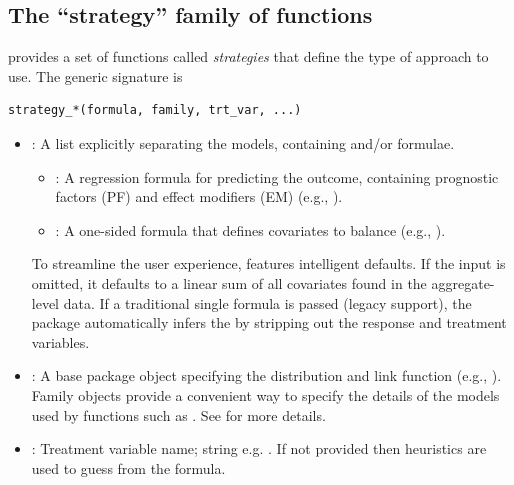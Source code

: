 \documentclass[article]{jss}
\begin{document}
\subsection{The ``strategy'' family of functions}
 provides a set of functions called \emph{strategies} that define the type of approach to use. The generic signature is

\begin{verbatim}
strategy_*(formula, family, trt_var, ...)
\end{verbatim}

\begin{itemize}
\item {}: A list explicitly separating the models, containing  and/or  formulae. 
    \begin{itemize}
        \item {}: A regression formula for predicting the outcome, containing prognostic factors (PF) and effect modifiers (EM) (e.g., ).
        \item {}: A one-sided formula that defines covariates to balance (e.g., ).
    \end{itemize}
    To streamline the user experience,  features intelligent defaults. If the input  is omitted, it defaults to a linear sum of all covariates found in the aggregate-level data. If a traditional single formula is passed (legacy support), the package automatically infers the  by stripping out the response and treatment variables.
    \item {}: A base   package  object specifying the distribution and link function (e.g., ). Family objects provide a convenient way to specify the details of the models used by functions such as . See  for more details.
    \item {}: Treatment variable name; string e.g. . If not provided then heuristics are used to guess from the  formula.
\end{itemize}
\end{document}
